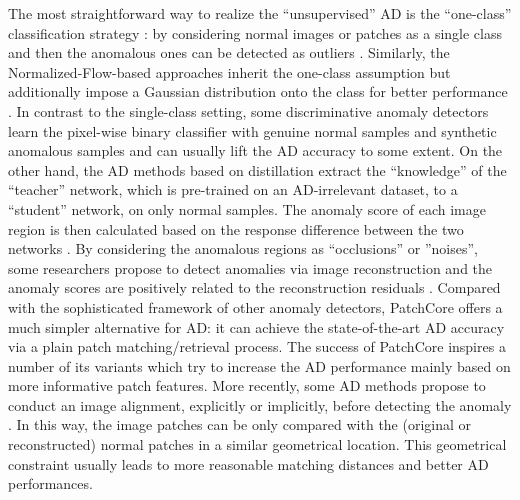 \documentclass[lettersize,journal]{IEEEtran}
\begin{document}
The most straightforward way to realize the ``unsupervised'' AD is the ``one-class'' classification strategy
\cite{scholkopf2000support, scholkopf2001estimating}: by considering normal images or
patches as a single class and then the anomalous ones can be detected as outliers
\cite{ruff2018deep, yi2020patch, liznerskiexplainable2020, massoli2021mocca,
  defard2021padim, zhang2022pedenet, chen2022deep, dinh2014nice, rudolph2021same}.
Similarly, the Normalized-Flow-based approaches inherit the one-class assumption but
additionally impose a Gaussian distribution onto the class for better performance
\cite{yu2021fastflow, tailanian2022u, gudovskiy2022cflow, lei2023pyramidflow}.
In contrast to the single-class setting, some discriminative anomaly detectors
\cite{li2021cutpaste, zavrtanik2021draem, yang2023memseg} learn the pixel-wise binary
classifier with genuine normal samples and synthetic anomalous samples and can usually
lift the AD accuracy to some extent.
On the other hand, the AD methods based on distillation extract the ``knowledge'' of the
``teacher'' network, which is pre-trained on an AD-irrelevant dataset, to a ``student''
network, on only normal samples. The anomaly score of each image region is then
calculated based on the response difference between the two networks
\cite{salehi2021multiresolution, deng2022anomaly, bergmann2022beyond, zhang2023destseg}.
By considering the anomalous regions as ``occlusions'' or ''noises'', some researchers
propose to detect anomalies via image reconstruction and the anomaly scores are
positively related to the reconstruction residuals \cite{zong2018deep,
  dehaene2020anomaly, shi2021unsupervised, hou2021divide, wu2021learning}.
Compared with the sophisticated framework of other anomaly detectors, PatchCore
\cite{roth2022towards} offers a much simpler alternative for AD: it can achieve the
state-of-the-art AD accuracy via a plain patch matching/retrieval process. The success
of PatchCore inspires a number of its variants \cite{kim2022fapm, bae2022image,
  xie2023pushing, saiku2022enhancing, zhu2022anomaly} which try to increase the AD
performance mainly based on more informative patch features.
More recently, some AD methods propose to conduct an image alignment, explicitly or
implicitly, before detecting the anomaly \cite{huang2022registration, zheng2022focus,
  liu2023diversity}. In this way, the image patches can be only compared with the
(original or reconstructed) normal patches in a similar geometrical location. This
geometrical constraint usually leads to more reasonable matching distances and better AD
performances.
\end{document}
